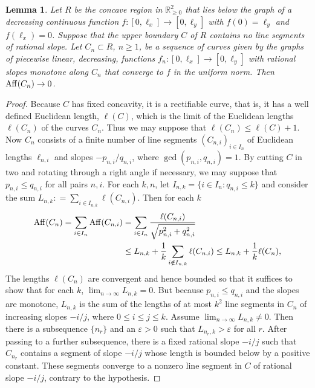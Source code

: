 \documentclass[11pt, reqno]{amsart}
\newtheorem{lemma}[thm]{Lemma}
\theoremstyle{remark}
\numberwithin{equation}{subsection}
\numberwithin{figure}{section}
\theoremstyle{customremark}
\newcommand{\Aff}{{\rm Aff}}
\newcommand{\R}{\mathbb{R}}
\newcommand{\eps}{\varepsilon}
\begin{document}
 
\begin{lemma}\label{lem:afflength} Let $R$ be the concave region in $\R^2_{\ge 0}$ that lies below the graph of a decreasing continuous function $f: [0,\ell_x]\to [0,\ell_y]$ with $f(0) = \ell_y$ and $f(\ell_x) = 0$. Suppose that the upper boundary $C$ of $R$ contains no line segments of rational slope. Let $C_n\subset R$, $n\ge 1$, be a sequence of curves given by the graphs of piecewise linear, decreasing, functions $f_n:[0,\ell_x]\to [0,\ell_y]$ with rational slopes monotone along $C_n$ that converge to $f$ in the uniform norm. Then $\Aff(C_n)\to 0$. \end{lemma} \begin{proof} Because $C$ has fixed concavity, it is a rectifiable curve, that is, it has a well defined Euclidean length, $\ell(C)$, which is the limit of the Euclidean lengths $\ell(C_n) $ of the curves $C_n$. Thus we may suppose that $\ell(C_n) \le \ell(C)+1$. Now $C_n$ consists of a finite number of line segments $(C_{n,i})_{i\in I_{n}}$ of Euclidean lengths $\ell_{n,i}$ and slopes $-p_{n,i}/q_{n,i}$, where $\gcd(p_{n,i},q_{n,i}) = 1$. By cutting $C$ in two and rotating through a right angle if necessary, we may suppose that $p_{n,i}\le q_{n,i}$ for all pairs $n,i$. For each $k,n$, let $I_{n,k} = \{i\in I_n : q_{n,i}\le k\}$ and consider the sum $L_{n,k}: = \sum_{i\in I_{n,k}} \ell (C_{n,i})$. Then for each $k$ \begin{align*} \Aff(C_n) = \sum_{i\in I_n} \Aff(C_{n,i}) &= \sum_{i\in I_n} \frac{ \ell(C_{n,i})}{\sqrt{p_{n,i}^2+ q_{n,i}^2}}\\ &\le L_{n,k} + \frac{1}{k} \sum_{i\notin I_{n,k}} \ell(C_{n,i}) \le L_{n,k} + \frac 1k \ell (C_n), 
\end{align*} The lengths $\ell(C_n)$ are convergent and hence bounded so that it suffices to show that for each $k$, $\lim_{n\to \infty} L_{n,k} = 0$. But because $p_{n,i}\le q_{n,i}$ and the slopes are monotone, $L_{n,k}$ is the sum of the lengths of at most $k^2$ line segments in $C_n$ of increasing slopes $-i/j$, where $0\le i\le j \le k$. Assume $\lim_{n\to \infty} L_{n,k} \ne 0$. Then there is a subsequence $\{n_r\}$ and an $\eps>0$ such that
$L_{n_r,k}>\eps$ for all $r$. 
After passing to a further subsequence, there is a fixed rational slope
$-i/j$ such that $C_{n_r}$ contains a segment of slope $-i/j$ whose
length is bounded below by a positive constant. These segments converge to a nonzero line segment in $C$ of rational slope $-i/j$, contrary to the hypothesis.
\end{proof}
\end{document}
